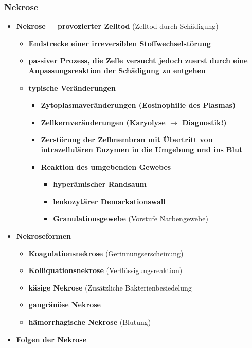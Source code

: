 \subsubsection{Nekrose}
	\begin{itemize}
		\item \textbf{Nekrose = provozierter Zelltod} (Zelltod durch Schädigung)
			\begin{itemize}
				\item \textbf{Endstrecke einer irreversiblen Stoffwechselstörung}
				\item \textbf{passiver Prozess, die Zelle versucht jedoch zuerst durch eine Anpassungsreaktion der Schädigung zu entgehen}
				\item \textbf{typische Veränderungen}
					\begin{itemize}
						\item \textbf{Zytoplasmaveränderungen (Eosinophilie des Plasmas)}
						\item \textbf{Zellkernveränderungen (Karyolyse $\rightarrow$ Diagnostik!)}
						\item \textbf{Zerstörung der Zellmembran mit Übertritt von intrazellulären Enzymen in die Umgebung und ins Blut}
						\item \textbf{Reaktion des umgebenden Gewebes}
							\begin{itemize}
								\item \textbf{hyperämischer Randsaum}
								\item \textbf{leukozytärer Demarkationswall}
								\item \textbf{Granulationsgewebe} (Vorstufe Narbengewebe)
							\end{itemize}
					\end{itemize}
			\end{itemize}
		\item \textbf{Nekroseformen}
			\begin{itemize}
				\item \textbf{Koagulationsnekrose} (Gerinnungserscheinung)
				\item \textbf{Kolliquationsnekrose} (Verflüssigungsreaktion)
				\item \textbf{käsige Nekrose} (Zusätzliche Bakterienbesiedelung
				\item \textbf{gangränöse Nekrose}
				\item \textbf{hämorrhagische Nekrose} (Blutung)
			\end{itemize}
		\item \textbf{Folgen der Nekrose}
			\begin{itemize}

\end{itemize}
\end{itemize}
